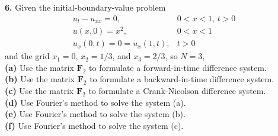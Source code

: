 \documentclass{amsbook}%
\theoremstyle{plain}
\numberwithin{equation}{section}
\begin{document}
		\noindent\textbf{6.} Given the initial-boundary-value problem
		\begin{align}
			u_t-u_{xx}=0, & 0<x<1,\, t>0\\
			u(x,0)=x^2, & 0<x<1\\
			u_x(0,t)=0=u_x(1,t), & t>0
		\end{align}
		and the grid $x_1=0$, $x_2=1/3$, and $x_3=2/3$, so $N=3$,\\
		\textbf{(a)} Use the matrix $\mathbf{F}_2$ to formulate a forward-in-time difference system.\\
		\textbf{(b)} Use the matrix $\mathbf{F}_2$ to formulate a backward-in-time difference system.\\
		\textbf{(c)} Use the matrix $\mathbf{F}_2$ to formulate a Crank-Nicolson difference system.\\
		\textbf{(d)} Use Fourier's method to solve the system (a).\\
		\textbf{(e)} Use Fourier's method to solve the system (b).\\
		\textbf{(f)} Use Fourier's method to solve the system (c).\\[12pt]
		
\end{document}
